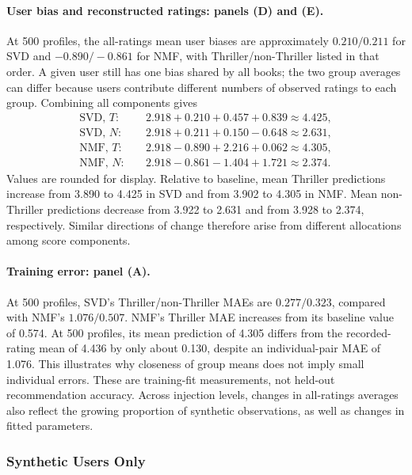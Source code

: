 \documentclass[information,article,submit,pdftex,moreauthors]{Definitions/mdpi}
\begin{document}
\paragraph{User bias and reconstructed ratings: panels (D) and (E).}
At 500 profiles, the all-ratings mean user biases are approximately $0.210/0.211$ for SVD and $-0.890/-0.861$ for NMF, with Thriller/non-Thriller listed in that order. A given user still has one bias shared by all books; the two group averages can differ because users contribute different numbers of observed ratings to each group. Combining all components gives
\begin{equation}
\label{eq:training_all_numeric}
\begin{aligned}
\text{SVD, }T:&\quad 2.918+0.210+0.457+0.839\approx4.425,\\
\text{SVD, }N:&\quad 2.918+0.211+0.150-0.648\approx2.631,\\
\text{NMF, }T:&\quad 2.918-0.890+2.216+0.062\approx4.305,\\
\text{NMF, }N:&\quad 2.918-0.861-1.404+1.721\approx2.374.
\end{aligned}
\end{equation}
Values are rounded for display. Relative to baseline, mean Thriller predictions increase from 3.890 to 4.425 in SVD and from 3.902 to 4.305 in NMF. Mean non-Thriller predictions decrease from 3.922 to 2.631 and from 3.928 to 2.374, respectively. Similar directions of change therefore arise from different allocations among score components.

\paragraph{Training error: panel (A).}
At 500 profiles, SVD's Thriller/non-Thriller MAEs are $0.277/0.323$, compared with NMF's $1.076/0.507$. NMF's Thriller MAE increases from its baseline value of 0.574. At 500 profiles, its mean prediction of 4.305 differs from the recorded-rating mean of 4.436 by only about 0.130, despite an individual-pair MAE of 1.076. This illustrates why closeness of group means does not imply small individual errors. These are training-fit measurements, not held-out recommendation accuracy. Across injection levels, changes in all-ratings averages also reflect the growing proportion of synthetic observations, as well as changes in fitted parameters.

\subsubsection{Synthetic Users Only}
\end{document}
